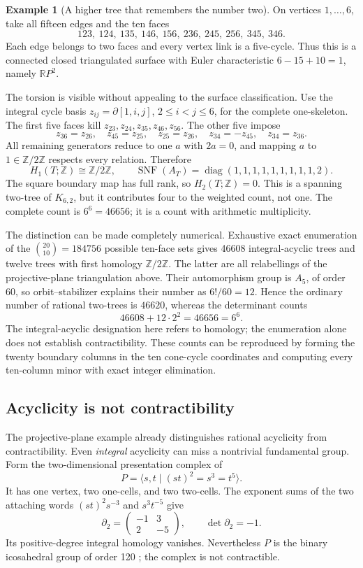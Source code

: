 \documentclass[11pt]{article}
\theoremstyle{definition}
\newtheorem{example}[theorem]{Example}
\theoremstyle{remark}
\newcommand{\Z}{\mathbb Z}
\newcommand{\R}{\mathbb R}
\begin{document}
\begin{example}[A higher tree that remembers the number two]
On vertices \(1,\ldots,6\), take all fifteen edges and the ten faces
\[
 123,\ 124,\ 135,\ 146,\ 156,\
 236,\ 245,\ 256,\ 345,\ 346.
\]
Each edge belongs to two faces and every vertex link is a five-cycle.
Thus this is a connected closed triangulated surface with Euler
characteristic \(6-15+10=1\), namely \(\R P^2\).

The torsion is visible without appealing to the surface classification.
Use the integral cycle basis
\(z_{ij}=\partial[1,i,j]\), \(2\le i<j\le6\), for the complete
one-skeleton.  The first five faces kill
\(z_{23},z_{24},z_{35},z_{46},z_{56}\).  The other five impose
\[
 z_{36}=z_{26},\quad z_{45}=z_{25},\quad z_{25}=z_{26},
 \quad z_{34}=-z_{45},\quad z_{34}=z_{36}.
\]
All remaining generators reduce to one \(a\) with \(2a=0\), and
mapping \(a\) to \(1\in\Z/2\Z\) respects every relation.  Therefore
\[
 H_1(T;\Z)\cong\Z/2\Z,
 \qquad \operatorname{SNF}(A_T)
        =\operatorname{diag}(1,1,1,1,1,1,1,1,1,2).
\]
The square boundary map has full rank, so \(H_2(T;\Z)=0\).
This is a spanning two-tree of \(K_{6,2}\), but it contributes four
to the weighted count, not one.  The complete count is \(6^6=46656\);
it is a count with arithmetic multiplicity.

The distinction can be made completely numerical. Exhaustive exact enumeration of the $\binom{20}{10}=184756$ possible ten-face sets gives 46608 integral-acyclic trees and twelve trees with first homology $\Z/2\Z$. The latter are all relabellings of the projective-plane triangulation above. Their automorphism group is $A_5$, of order $60$, so orbit--stabilizer explains their number as $6!/60=12$. Hence the ordinary number of rational two-trees is $46620$, whereas the determinant counts
\[
 46608+12\cdot 2^2=46656=6^6.
\]
The integral-acyclic designation here refers to homology; the enumeration alone does not establish contractibility. These counts can be reproduced by forming the twenty boundary columns in the ten cone-cycle coordinates and computing every ten-column minor with exact integer elimination.
\end{example}

\subsection{Acyclicity is not contractibility}

The projective-plane example already distinguishes rational acyclicity
from contractibility.  Even \emph{integral} acyclicity can miss a
nontrivial fundamental group.  Form the two-dimensional presentation
complex of
\[
 P=\langle s,t\mid(st)^2=s^3=t^5\rangle.
\]
It has one vertex, two one-cells, and two two-cells.  The exponent sums
of the two attaching words \((st)^2s^{-3}\) and \(s^3t^{-5}\) give
\[
 \partial_2=
 \begin{pmatrix}-1&3\\2&-5\end{pmatrix},
 \qquad \det\partial_2=-1.
\]
Its positive-degree integral homology vanishes.  Nevertheless \(P\)
is the binary icosahedral group of order 120
\cite{gih-brini-icosahedral}; the complex is not contractible.
\end{document}
